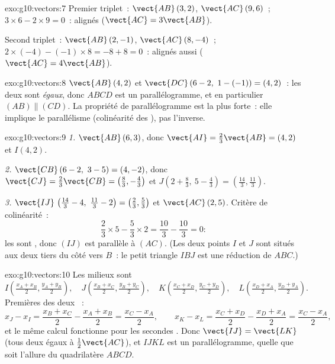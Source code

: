 \begin{solution}{exo:g10:vectors:7}
Premier triplet~: $\vect{AB}\,(3, 2)$, $\vect{AC}\,(9, 6)$~;
$3 \times 6 - 2 \times 9 = 0$~: alignés ($\vect{AC} = 3\vect{AB}$).

Second triplet~: $\vect{AB}\,(2, -1)$, $\vect{AC}\,(8, -4)$~;
$2 \times (-4) - (-1) \times 8 = -8 + 8 = 0$~: alignés aussi
($\vect{AC} = 4\vect{AB}$).
\end{solution}

\begin{solution}{exo:g10:vectors:8}
$\vect{AB}\,(4, 2)$ et $\vect{DC}\,(6-2,\ 1-(-1)) = (4, 2)$~: les deux
 sont \emph{égaux}, donc $ABCD$ est un parallélogramme, et en
particulier $(AB) \parallel (CD)$. La propriété de parallélogramme est
la plus forte~: elle implique le parallélisme (colinéarité des
), pas l'inverse.
\end{solution}

\begin{solution}{exo:g10:vectors:9}
\emph{1.} $\vect{AB}\,(6, 3)$, donc
$\vect{AI} = \frac23\vect{AB} = (4, 2)$ et $I(4, 2)$.

\emph{2.} $\vect{CB}\,(6-2,\ 3-5) = (4, -2)$, donc
$\vect{CJ} = \frac23\vect{CB} = \left(\frac83, -\frac43\right)$ et
$J\left(2 + \frac83,\ 5 - \frac43\right) = \left(\frac{14}{3},
\frac{11}{3}\right)$.

\emph{3.} $\vect{IJ}\,\left(\frac{14}{3} - 4,\ \frac{11}{3} - 2\right) =
\left(\frac23, \frac53\right)$ et $\vect{AC}\,(2, 5)$. Critère de
colinéarité~:
\[
\frac23 \times 5 - \frac53 \times 2 = \frac{10}{3} - \frac{10}{3} = 0 :
\]
les  sont , donc $(IJ)$ est parallèle à $(AC)$.
(Les deux points $I$ et $J$ sont situés aux deux tiers du côté vers
$B$~: le petit triangle $IBJ$ est une réduction de $ABC$.)
\end{solution}

\begin{solution}{exo:g10:vectors:10}
Les milieux sont
\[
I\left(\tfrac{x_A + x_B}{2}, \tfrac{y_A + y_B}{2}\right), \quad
J\left(\tfrac{x_B + x_C}{2}, \tfrac{y_B + y_C}{2}\right), \quad
K\left(\tfrac{x_C + x_D}{2}, \tfrac{y_C + y_D}{2}\right), \quad
L\left(\tfrac{x_D + x_A}{2}, \tfrac{y_D + y_A}{2}\right).
\]
Premières  des deux ~:
\[
x_J - x_I = \frac{x_B + x_C}{2} - \frac{x_A + x_B}{2}
= \frac{x_C - x_A}{2},
\qquad
x_K - x_L = \frac{x_C + x_D}{2} - \frac{x_D + x_A}{2}
= \frac{x_C - x_A}{2},
\]
et le même calcul fonctionne pour les secondes . Donc
$\vect{IJ} = \vect{LK}$ (tous deux égaux à $\frac12\vect{AC}$), et
$IJKL$ est un parallélogramme, quelle que soit l'allure du
quadrilatère $ABCD$.
\end{solution}

